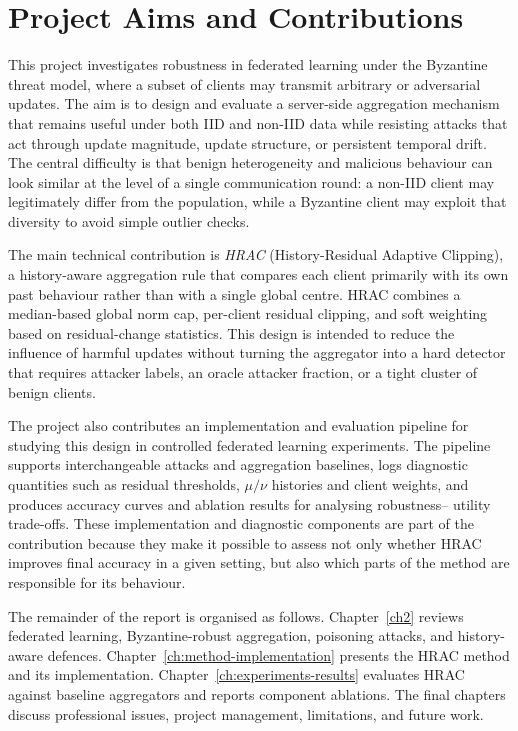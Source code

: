 \section{Project Aims and Contributions}
This project investigates robustness in federated learning under the Byzantine
threat model, where a subset of clients may transmit arbitrary or adversarial
updates. The aim is to design and evaluate a server-side aggregation mechanism
that remains useful under both IID and non-IID data while resisting attacks that
act through update magnitude, update structure, or persistent temporal drift.
The central difficulty is that benign heterogeneity and malicious behaviour can
look similar at the level of a single communication round: a non-IID client may
legitimately differ from the population, while a Byzantine client may exploit
that diversity to avoid simple outlier checks.

The main technical contribution is \emph{HRAC} (History-Residual Adaptive
Clipping), a history-aware aggregation rule that compares each client primarily
with its own past behaviour rather than with a single global centre. HRAC
combines a median-based global norm cap, per-client residual clipping, and
soft weighting based on residual-change statistics. This design is intended to
reduce the influence of harmful updates without turning the aggregator into a
hard detector that requires attacker labels, an oracle attacker fraction, or a
tight cluster of benign clients.

The project also contributes an implementation and evaluation pipeline for
studying this design in controlled federated learning experiments. The pipeline
supports interchangeable attacks and aggregation baselines, logs diagnostic
quantities such as residual thresholds, $\mu/\nu$ histories and client weights,
and produces accuracy curves and ablation results for analysing robustness--
utility trade-offs. These implementation and diagnostic components are part of
the contribution because they make it possible to assess not only whether HRAC
improves final accuracy in a given setting, but also which parts of the method
are responsible for its behaviour.

The remainder of the report is organised as follows. Chapter~\ref{ch2} reviews
federated learning, Byzantine-robust aggregation, poisoning attacks, and
history-aware defences. Chapter~\ref{ch:method-implementation} presents the
HRAC method and its implementation. Chapter~\ref{ch:experiments-results}
evaluates HRAC against baseline aggregators and reports component ablations.
The final chapters discuss professional issues, project management,
limitations, and future work.
